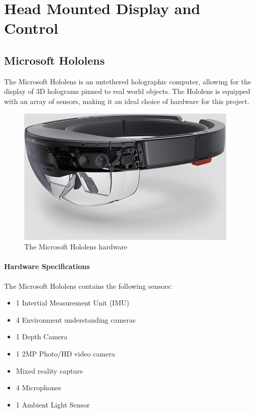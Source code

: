 \documentclass[12pt,a4paper]{report}
\begin{document}
\section{Head Mounted Display and Control}

\subsection{Microsoft Hololens}
The Microsoft Hololens is an untethered holographic computer, allowing for the display of 3D holograms pinned to real world objects. The Hololens is equipped with an array of sensors, making it an ideal choice of hardware for this project.

\begin{figure}[h!]
	\begin{center}
		\includegraphics[scale=0.4]{Images/Literature/hololens.jpg}
		\caption{The Microsoft Hololens hardware \citep{Zeller}}
	\end{center}
\end{figure}

\paragraph{Hardware Specifications}
The Microsoft Hololens contains the following sensors:

\begin{itemize}
	\item 1 Intertial Measurement Unit (IMU)
	\item 4 Environment understanding cameras
	\item 1 Depth Camera
	\item 1 2MP Photo/HD video camera
	\item Mixed reality capture
	\item 4 Microphones
	\item 1 Ambient Light Sensor
\end{itemize}
\end{document}
